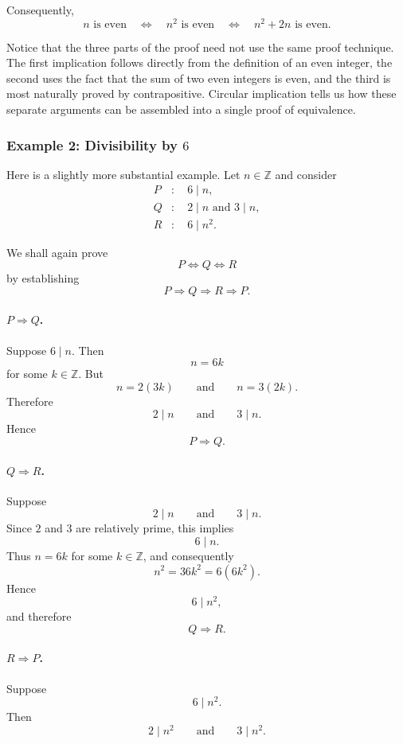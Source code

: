 Consequently,
\[
\boxed{
n\text{ is even}
\quad\Longleftrightarrow\quad
n^2\text{ is even}
\quad\Longleftrightarrow\quad
n^2+2n\text{ is even}.
}
\]

Notice that the three parts of the proof need not use the same proof
technique. The first implication follows directly from the definition
of an even integer, the second uses the fact that the sum of two even
integers is even, and the third is most naturally proved by
contrapositive. Circular implication tells us how these separate
arguments can be assembled into a single proof of equivalence.


\subsubsection*{Example 2: Divisibility by $6$}

Here is a slightly more substantial example. Let $n\in\mathbb Z$ and
consider
\[
\begin{aligned}
P &: \quad 6\mid n,\\
Q &: \quad 2\mid n\text{ and }3\mid n,\\
R &: \quad 6\mid n^2.
\end{aligned}
\]

We shall again prove
\[
        P\Longleftrightarrow Q\Longleftrightarrow R
\]
by establishing
\[
        P\Longrightarrow Q
        \Longrightarrow R
        \Longrightarrow P.
\]

\paragraph{$P\Rightarrow Q$.}
Suppose $6\mid n$. Then
\[
        n=6k
\]
for some $k\in\mathbb Z$. But
\[
        n=2(3k)
        \qquad\text{and}\qquad
        n=3(2k).
\]
Therefore
\[
        2\mid n
        \qquad\text{and}\qquad
        3\mid n.
\]
Hence
\[
        P\Longrightarrow Q.
\]

\paragraph{$Q\Rightarrow R$.}
Suppose
\[
        2\mid n
        \qquad\text{and}\qquad
        3\mid n.
\]
Since $2$ and $3$ are relatively prime, this implies
\[
        6\mid n.
\]
Thus $n=6k$ for some $k\in\mathbb Z$, and consequently
\[
        n^2=36k^2=6(6k^2).
\]
Hence
\[
        6\mid n^2,
\]
and therefore
\[
        Q\Longrightarrow R.
\]

\paragraph{$R\Rightarrow P$.}
Suppose
\[
        6\mid n^2.
\]
Then
\[
        2\mid n^2
        \qquad\text{and}\qquad
        3\mid n^2.
\]

